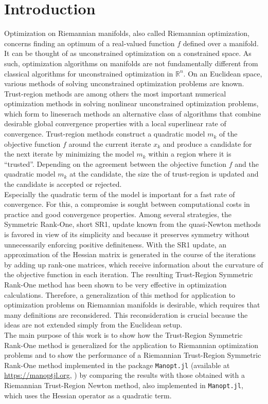 \chapter{Introduction}

Optimization on Riemannian manifolds, also called Riemannian optimization, concerns finding an optimum of a real-valued function $f$ defined over a manifold. It can be thought of as unconstrained optimization on a constrained space. As such, optimization algorithms on manifolds are not fundamentally different from classical algorithms for unconstrained optimization in $\mathbb{R}^n$. On an Euclidean space, various methods of solving unconstrained optimization problems are known. \\
Trust-region methods are among others the most important numerical optimization methods in solving nonlinear unconstrained optimization problems, which form to lineserach methods an alternative class of algorithms that combine desirable global convergence properties with a local superlinear rate of convergence. Trust-region methods construct a quadratic model $m_k$ of the objective function $f$ around the current iterate $x_k$ and produce a candidate for the next iterate by minimizing the model $m_k$ within a region where it is “trusted”. Depending on the agreement between the objective function $f$ and the quadratic model $m_k$ at the candidate, the size the of trust-region is updated and the candidate is accepted or rejected. \\
Especially the quadratic term of the model is important for a fast rate of convergence. For this, a compromise is sought between computational costs in practice and good convergence properties. Among several strategies, the Symmetric Rank-One, short SR1, update known from the quasi-Newton methods is favored in view of its simplicity and because it preserves symmetry without unnecessarily enforcing positive definiteness. With the SR1 update, an approximation of the Hessian matrix is generated in the course of the iterations by adding up rank-one matrices, which receive information about the curvature of the objective function in each iteration. The resulting Trust-Region Symmetric Rank-One method has been shown to be very effective in optimization calculations. Therefore, a generalization of this method for application to optimization problems on Riemannian manifolds is desirable, which requires that many definitions are reconsidered. This reconsideration is crucial because the ideas are not extended simply from the Euclidean setup. \\
The main purpose of this work is to show how the Trust-Region Symmetric Rank-One method is generalized for the application to Riemannian optimization problems and to show the performance of a Riemannian Trust-Region Symmetric Rank-One method implemented in the package \lstinline!Manopt.jl! (available at \url{https://manoptjl.org}, \cite{Bergmann:2019}) by comparing the results with those obtained with a Riemannian Trust-Region Newton method, also implemented in \lstinline!Manopt.jl!, which uses the Hessian operator as a quadratic term. 

